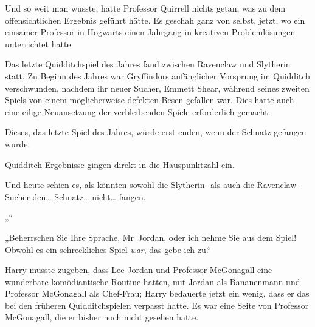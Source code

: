 Und so weit man wusste, hatte Professor Quirrell nichts getan, was zu dem offensichtlichen Ergebnis geführt hätte. Es geschah ganz von selbst, jetzt, wo ein einsamer Professor in Hogwarts einen Jahrgang in kreativen Problemlösungen unterrichtet hatte.

Das letzte Quidditchspiel des Jahres fand zwischen Ravenclaw und Slytherin statt. Zu Beginn des Jahres war Gryffindors anfänglicher Vorsprung im Quidditch verschwunden, nachdem ihr neuer Sucher, Emmett Shear, während seines zweiten Spiels von einem möglicherweise defekten Besen gefallen war. Dies hatte auch eine eilige Neuansetzung der verbleibenden Spiele erforderlich gemacht.

Dieses, das letzte Spiel des Jahres, würde erst enden, wenn der Schnatz gefangen wurde.

Quidditch-Ergebnisse gingen direkt in die Hauspunktzahl ein.

Und heute schien es, als könnten sowohl die Slytherin- als auch die Ravenclaw-Sucher den… Schnatz… nicht… fangen.

„“

„Beherrschen Sie Ihre Sprache, Mr~Jordan, oder ich nehme Sie aus dem Spiel! Obwohl es ein schreckliches Spiel \emph{war}, das gebe ich zu.“

Harry musste zugeben, dass Lee Jordan und Professor McGonagall eine wunderbare komödiantische Routine hatten, mit Jordan als Bananenmann und Professor McGonagall als Chef-Frau; Harry bedauerte jetzt ein wenig, dass er das bei den früheren Quidditchspielen verpasst hatte. Es war eine Seite von Professor McGonagall, die er bisher noch nicht gesehen hatte.

